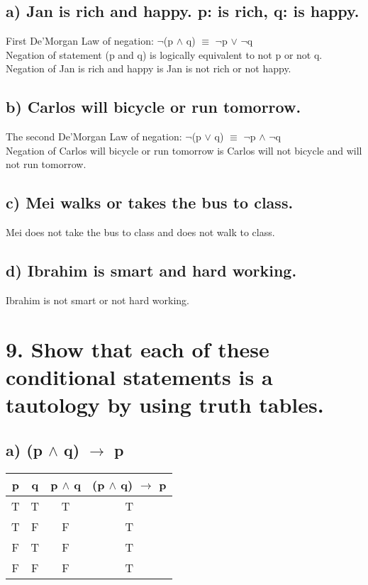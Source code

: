 \documentclass[11pt, oneside]{article} %
\numberwithin{equation}{section} %
\numberwithin{figure}{section} %
\begin{document}
\subsection{a) Jan is rich and happy. p: is rich, q: is happy.}
First De'Morgan Law of negation: $\neg$(p $\wedge$ q) $\equiv$ $\neg$p $\vee$ $\neg$q\\
Negation of statement (p and q) is logically equivalent to not p or not q. \\
Negation of Jan is rich and happy is Jan is not rich or not happy.

\subsection{b) Carlos will bicycle or run tomorrow.}
The second De'Morgan Law of negation: $\neg$(p $\vee$ q) $\equiv$ $\neg$p $\wedge$ $\neg$q \\
Negation of Carlos will bicycle or run tomorrow is Carlos will not bicycle and will not run tomorrow.

\subsection{c) Mei walks or takes the bus to class.}
Mei does not take the bus to class and does not walk to class.

\subsection{d) Ibrahim is smart and hard working.}
Ibrahim is not smart or not hard working.


\begin{table}[!htp]
\section{9. Show that each of these conditional statements is a tautology by using truth tables.}
\subsection{a) (p $\wedge$ q) $\rightarrow$ p}
\begin{tabular}{c c c c}
\hline\hline
p & q & p $\wedge$ q & (p $\wedge$ q) $\rightarrow$ p \\ [0.5ex] %
\hline
T & T & T & T\\
T & F & F & T\\
F & T & F & T\\
F & F & F & T\\ [1ex]
\hline
\end{tabular}
\label{table:nonlin}
\end{table}
\end{document}
